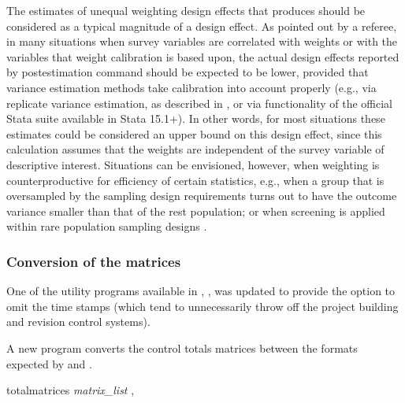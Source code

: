 
The estimates of unequal weighting design effects that  produces
should be considered as a typical magnitude of a design effect.
As pointed out by a referee, in many situations when survey variables are correlated with weights
or with the variables that weight calibration is based upon, the actual
design effects reported by postestimation command  should be expected
to be lower, provided that variance estimation methods take calibration
into account properly (e.g., via replicate variance estimation, as described
in \citet{kolenikov:2010}, or via  functionality
of the official Stata  suite available in Stata 15.1+).
In other words, for most situations these estimates could be considered an upper bound
on this design effect, since this calculation assumes that the weights are independent of
the survey variable of descriptive interest. Situations can be envisioned, however,
when weighting is counterproductive for efficiency of certain statistics,
e.g., when a group that is oversampled by the sampling design requirements
turns out to have the outcome variance smaller than that of the rest population;
or when screening is applied within rare population sampling designs
\citep{kalton:anderson:1986,kalton:2009}.

\subsubsection{Conversion of the matrices}

One of the utility programs available in \citet{kolenikov:2014}, ,
was updated to provide the  option to omit the time stamps
(which tend to unnecessarily throw off the project building and revision control systems).

A new program  converts the control totals matrices between
the formats expected by  and . 

\begin{stsyntax}
totalmatrices
{\it matrix\_list}
,
\end{stsyntax}

